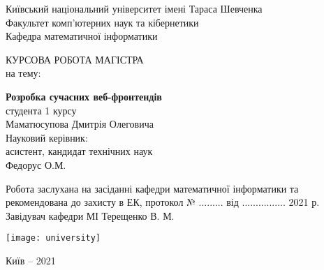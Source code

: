 \begin{titlepage}
    \begin{center}

        Київський національний університет імені Тараса Шевченка\\
        Факультет комп’ютерних наук та кібернетики\\
        Кафедра математичної інформатики\\

        \vspace*{5cm}

        КУРСОВА РОБОТА МАГІСТРА\\
        на тему:\\

        \vspace*{1cm}

        \textbf{Розробка сучасних веб-фронтендів}\\

        \vspace{1.5cm}
        \hspace{6cm}
        студента 1 курсу\\
        \hspace{6cm}
        Маматюсупова Дмитрія Олеговича\\

        \vspace{1.5cm}
        \hspace{6cm}
        Науковий керівник:\\
        \hspace{6cm}
        асистент, кандидат технічних наук\\
        \hspace{6cm}
        Федорус О.М.\\


        \vspace{3cm}

        Робота заслухана на засіданні кафедри математичної інформатики та\\
        рекомендована до захисту в ЕК, протокол № ......... від ................ 2021 р.\\

        \vspace{1cm}
        Завідувач кафедри МІ \hspace{5cm}   Терещенко В. М.

        \vspace{1cm}
        \vfill

        \vspace{0.8cm}

        \texttt{[image: university]}

        Київ -- 2021

    \end{center}
\end{titlepage}
